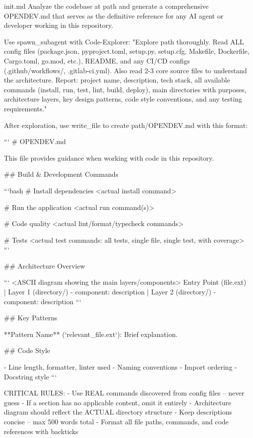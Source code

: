 \begin{prompttemplate}{init.md}
Analyze the codebase at {path} and generate a comprehensive OPENDEV.md
that serves as the definitive reference for any AI agent or developer
working in this repository.

Use spawn_subagent with Code-Explorer:
"Explore {path} thoroughly. Read ALL config files (package.json,
pyproject.toml, setup.py, setup.cfg, Makefile, Dockerfile, Cargo.toml,
go.mod, etc.), README, and any CI/CD configs (.github/workflows/,
.gitlab-ci.yml). Also read 2-3 core source files to understand the
architecture. Report: project name, description, tech stack, all
available commands (install, run, test, lint, build, deploy), main
directories with purposes, architecture layers, key design patterns,
code style conventions, and any testing requirements."

After exploration, use write_file to create {path}/OPENDEV.md with this
format:

```
# OPENDEV.md

This file provides guidance when working with code in this repository.

## Build & Development Commands

```bash
# Install dependencies
<actual install command>

# Run the application
<actual run command(s)>

# Code quality
<actual lint/format/typecheck commands>

# Tests
<actual test commands: all tests, single file, single test, with coverage>
```

## Architecture Overview

```
<ASCII diagram showing the main layers/components>
Entry Point (file.ext)
       |
Layer 1 (directory/)
  - component: description
       |
Layer 2 (directory/)
  - component: description
```

## Key Patterns

**Pattern Name** (`relevant_file.ext`): Brief explanation.

## Code Style

- Line length, formatter, linter used
- Naming conventions
- Import ordering
- Docstring style
```

CRITICAL RULES:
- Use REAL commands discovered from config files -- never guess
- If a section has no applicable content, omit it entirely
- Architecture diagram should reflect the ACTUAL directory structure
- Keep descriptions concise -- max 500 words total
- Format all file paths, commands, and code references with backticks
\end{prompttemplate}

